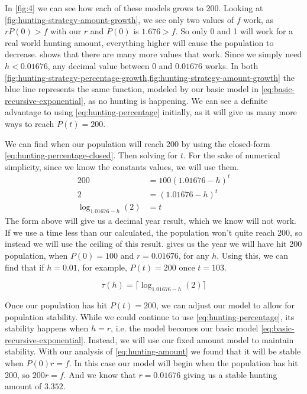 \documentclass{article}
\begin{document}
In \cref{fig:4} we can see how each of these models grows to 200. Looking at \cref{fig:hunting-strategy-amount-growth}, we see only two values of $f$ work, as $rP(0) > f$ with our $r$ and $P(0)$ is $1.676 > f$. So only 0 and 1 will work for a real world hunting amount, everything higher will cause the population to decrease.  shows that there are many more values that work. Since we simply need $h < 0.01676$, any decimal value between $0$ and $0.01676$ works. In both \cref{fig:hunting-strategy-percentage-growth,fig:hunting-strategy-amount-growth} the blue line represents the same function, modeled by our basic model in  \cref{eq:basic-recursive-exponential}, as no hunting is happening. We can see a definite advantage to using \cref{eq:hunting-percentage} initially, as it will give us many more ways to reach $P(t)=200$.

We can find when our population will reach 200 by using the closed-form \cref{eq:hunting-percentage-closed}. Then solving for $t$. For the sake of numerical simplicity, since we know the constants values, we will use them.
\begin{align*}
    200 &= 100(1.01676-h)^t \\
    2 &= (1.01676-h)^t \\
    \log_{1.01676-h}(2) &= t
\end{align*}
The form above will give us a decimal year result, which we know will not work. If we use a time less than our calculated, the population won't quite reach 200, so instead we will use the ceiling of this result.  gives us the year we will have hit 200 population, when $P(0) = 100$ and $r = 0.01676$, for any $h$. Using this, we can find that if $h=0.01$, for example, $P(t) = 200$ once $t = 103$.

\begin{equation}\label{eq:hunting-strategy-time}
    \tau(h) = \lceil\log_{1.01676-h}(2)\rceil
\end{equation}

Once our population has hit $P(t)=200$, we can adjust our model to allow for population stability. While we could continue to use \cref{eq:hunting-percentage}, its stability happens when $h=r$, i.e. the model becomes our basic model \cref{eq:basic-recursive-exponential}. Instead, we will use our fixed amount model to maintain stability. With our analysis of \cref{eq:hunting-amount} we found that it will be stable when $P(0)r = f$. In this case our model will begin when the population has hit 200, so $200r=f$. And we know that $r = 0.01676$ giving us a stable hunting amount of $3.352$.
\end{document}
